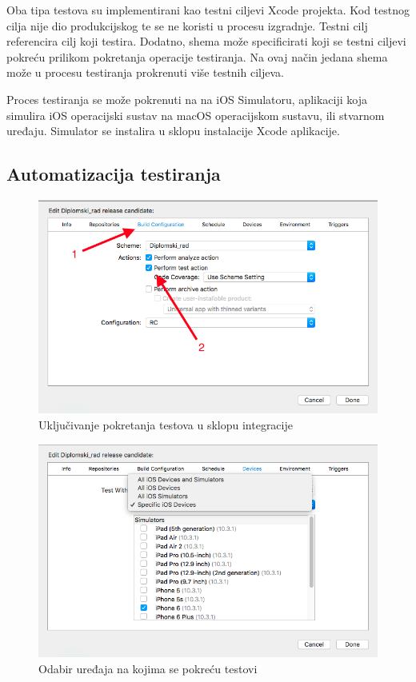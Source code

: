 \documentclass[times, utf8, diplomski, numeric]{fer}
\begin{document}
Oba tipa testova su implementirani kao testni ciljevi Xcode projekta. Kod testnog cilja nije dio produkcijskog te se ne koristi u procesu izgradnje. Testni cilj referencira cilj koji testira. Dodatno, shema može specificirati koji se testni ciljevi pokreću prilikom pokretanja operacije testiranja. Na ovaj način jedana shema može u procesu testiranja prokrenuti više testnih ciljeva.

Proces testiranja se može pokrenuti na na iOS Simulatoru, aplikaciji koja simulira iOS operacijski sustav na macOS operacijskom sustavu, ili stvarnom uređaju. Simulator se instalira u sklopu instalacije Xcode aplikacije.

\subsection{Automatizacija testiranja}

\begin{figure}[b!]
\centering
\includegraphics[scale=0.5]{XcodeServerTestAction}
\caption{Uključivanje pokretanja testova u sklopu integracije}
\label{fig:XcodeServerTestAction}
\end{figure}

\begin{figure}
\centering
\includegraphics[scale=0.5]{XcodeServerTestDevices}
\caption{Odabir uređaja na kojima se pokreću testovi}
\label{fig:XcodeServerTestDevices}
\end{figure}
\end{document}
